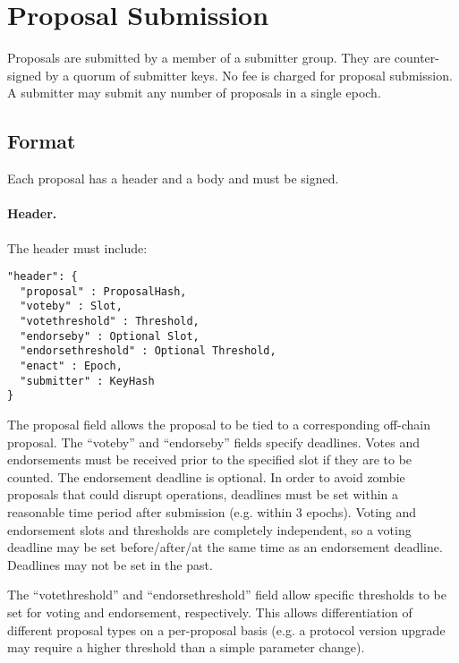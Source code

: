\section{Proposal Submission}

Proposals are submitted by a member of a submitter group.  They are counter-signed by a quorum of submitter keys.
No fee is charged for proposal submission.
A submitter may submit any number of proposals in a single epoch.

\subsection{Format}

Each proposal has a header and a body and must be signed.

\paragraph{Header.} The header must include:

\begin{verbatim}
"header": {
  "proposal" : ProposalHash,
  "voteby" : Slot,
  "votethreshold" : Threshold,
  "endorseby" : Optional Slot,
  "endorsethreshold" : Optional Threshold,
  "enact" : Epoch,
  "submitter" : KeyHash
}
\end{verbatim}

The proposal field allows the proposal to be tied to a corresponding off-chain proposal.  The ``voteby'' and ``endorseby'' fields specify deadlines.
Votes and endorsements must be received prior to the specified slot if they are to be counted.  The endorsement deadline is optional.
In order to avoid zombie proposals that could disrupt operations, deadlines must be set within a reasonable time period after submission (e.g. within 3 epochs).
Voting and endorsement slots and thresholds are completely independent, so a voting deadline may be set before/after/at the same time as an endorsement deadline.
Deadlines may not be set in the past.


The ``votethreshold'' and ``endorsethreshold'' field allow specific thresholds to be set for voting and endorsement, respectively.  This allows differentiation of different proposal types on a per-proposal basis
(e.g. a protocol version upgrade may require a higher threshold than a simple parameter change).

